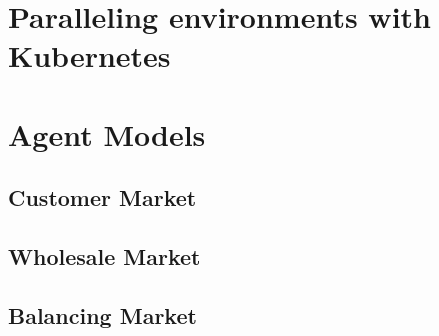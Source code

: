 \section{Paralleling environments with Kubernetes}
\section{Agent Models}
\subsection{Customer Market}

%
%

\subsection{Wholesale Market}
\subsection{Balancing Market}
